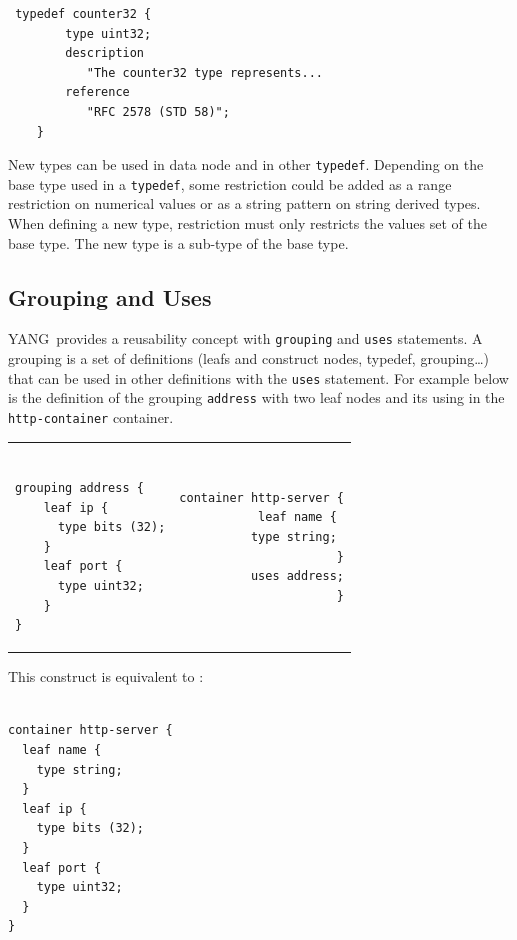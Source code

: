 \documentclass[a4paper]{article}
\newcommand{\y}{YANG}
\begin{document}
\begin{verbatim}
 typedef counter32 {
        type uint32;
        description
           "The counter32 type represents...
        reference
           "RFC 2578 (STD 58)";
    }
\end{verbatim}

New  types can  be  used in  data  node and  in  other {\tt  typedef}.
Depending on the  base type used in a  {\tt typedef}, some restriction
could be  added as  a range  restriction on numerical  values or  as a
string  pattern on  string derived  types. When  defining a  new type,
restriction must only  restricts the values set of  the base type. The
new type is a sub-type of the base type.

\subsection{Grouping and Uses}

\y\ provides a reusability concept  with {\tt grouping} and {\tt uses}
statements. A  grouping is a  set of definitions (leafs  and construct
nodes, typedef, grouping\ldots) that  can be used in other definitions
with the {\tt uses} statement.  For example below is the definition of
the grouping  {\tt address} with two  leaf nodes and its  using in the
{\tt http-container} container.

\noindent
\begin{tabular}{lr}
\begin{minipage}{.5\textwidth}
\begin{verbatim}

grouping address {
    leaf ip {
      type bits (32);
    }
    leaf port {
      type uint32;
    }
}
\end{verbatim}
\end{minipage}
&
\begin{minipage}{.5\textwidth}
\begin{verbatim}
container http-server {
  leaf name { 
    type string; 
  }
  uses address;
}
\end{verbatim}
\end{minipage}
\end{tabular}

This construct is equivalent to :

\noindent
\begin{verbatim}

container http-server {
  leaf name { 
    type string; 
  }
  leaf ip {
    type bits (32);
  }
  leaf port {
    type uint32;
  }
}
\end{verbatim}
\end{document}
